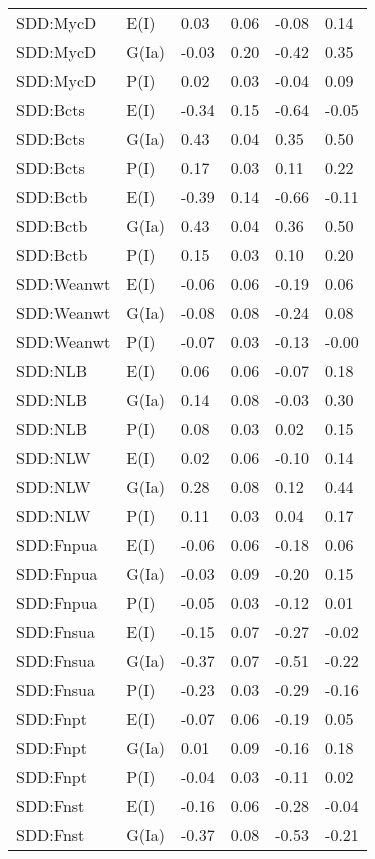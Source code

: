 \begin{center}
\begin{longtable}{|p{1.1in}|p{0.7in}|p{0.7in}|p{0.6in}|p{0.6in}|p{0.6in}|}
  SDD:MycD & E(I) & 0.03 & 0.06 & -0.08 & 0.14 \\ 
  SDD:MycD & G(Ia) & -0.03 & 0.20 & -0.42 & 0.35 \\ 
  SDD:MycD & P(I) & 0.02 & 0.03 & -0.04 & 0.09 \\ 
  SDD:Bcts & E(I) & -0.34 & 0.15 & -0.64 & -0.05 \\ 
  SDD:Bcts & G(Ia) & 0.43 & 0.04 & 0.35 & 0.50 \\ 
  SDD:Bcts & P(I) & 0.17 & 0.03 & 0.11 & 0.22 \\ 
  SDD:Bctb & E(I) & -0.39 & 0.14 & -0.66 & -0.11 \\ 
  SDD:Bctb & G(Ia) & 0.43 & 0.04 & 0.36 & 0.50 \\ 
  SDD:Bctb & P(I) & 0.15 & 0.03 & 0.10 & 0.20 \\ 
  SDD:Weanwt & E(I) & -0.06 & 0.06 & -0.19 & 0.06 \\ 
  SDD:Weanwt & G(Ia) & -0.08 & 0.08 & -0.24 & 0.08 \\ 
  SDD:Weanwt & P(I) & -0.07 & 0.03 & -0.13 & -0.00 \\ 
  SDD:NLB & E(I) & 0.06 & 0.06 & -0.07 & 0.18 \\ 
  SDD:NLB & G(Ia) & 0.14 & 0.08 & -0.03 & 0.30 \\ 
  SDD:NLB & P(I) & 0.08 & 0.03 & 0.02 & 0.15 \\ 
  SDD:NLW & E(I) & 0.02 & 0.06 & -0.10 & 0.14 \\ 
  SDD:NLW & G(Ia) & 0.28 & 0.08 & 0.12 & 0.44 \\ 
  SDD:NLW & P(I) & 0.11 & 0.03 & 0.04 & 0.17 \\ 
  SDD:Fnpua & E(I) & -0.06 & 0.06 & -0.18 & 0.06 \\ 
  SDD:Fnpua & G(Ia) & -0.03 & 0.09 & -0.20 & 0.15 \\ 
  SDD:Fnpua & P(I) & -0.05 & 0.03 & -0.12 & 0.01 \\ 
  SDD:Fnsua & E(I) & -0.15 & 0.07 & -0.27 & -0.02 \\ 
  SDD:Fnsua & G(Ia) & -0.37 & 0.07 & -0.51 & -0.22 \\ 
  SDD:Fnsua & P(I) & -0.23 & 0.03 & -0.29 & -0.16 \\ 
  SDD:Fnpt & E(I) & -0.07 & 0.06 & -0.19 & 0.05 \\ 
  SDD:Fnpt & G(Ia) & 0.01 & 0.09 & -0.16 & 0.18 \\ 
  SDD:Fnpt & P(I) & -0.04 & 0.03 & -0.11 & 0.02 \\ 
  SDD:Fnst & E(I) & -0.16 & 0.06 & -0.28 & -0.04 \\ 
  SDD:Fnst & G(Ia) & -0.37 & 0.08 & -0.53 & -0.21 \\ 

\end{longtable}
\end{center}

